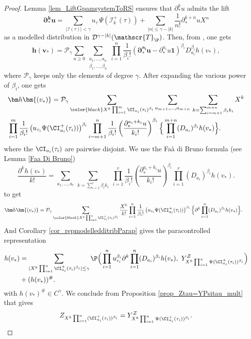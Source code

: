 \documentclass[11pt]{preprint}
\newcommand{\mcI}{\mathcal{I}}
\newcommand{\mcD}{\mathcal{D}}
\newcommand{\mcZ}{\mathcal{Z}}
\def\one{\mathbf{1}}
\newcommand{\scrT}{\mathscr{T}}
\begin{document}
	\begin{proof}
		Lemma \ref{lem_LiftGpamsystemToRS} ensures that $\partial^k_{*}u$ admits the lift
$$	\bm{\partial_{*}^{k} u} = \sum_{|\mcI(\tau)|<\gamma } u_\tau \, \Psi(\mcI_{k}^+ (\tau))  + \sum_{ |n|\leq \gamma - |k|} \frac{1}{n!}\partial_*^{k + n} u X^{n}$$
as a modelled distribution in $\mcD^{\gamma-|k|}(\scrT_\P)$. Then, from  \cite[Theorem 4.16]{Hai14}, one gets
		$$
		{\bm h}\bm{(v_{*} )} = \mathcal{P}_{\gamma} \sum_{n \geq 0 } \sum_{\substack{ a_1,...,a_n \\ \beta_1,...,\beta_n}} \prod_{i=1}^n \frac{1}{\beta_i !} ( 	\bm{\partial_{*}^{a_i} u} -  \partial_{*}^{a_i} u \one)^{\beta_i} D_{a_i}^{\beta_i} h(v_*),
		$$
		where $\mathcal{P}_{\gamma}$ keeps only the elements of degree $\gamma$. After expanding the various power of $\beta_i$, one gets
		\begin{equation*}
			\begin{aligned}
	&	{\bm h}\bm{(v_{*} )} = \mathcal{P}_{\gamma} 
	\sum_{{\color{black} X^k \prod_{i=1}^m\CI_{a_i}(\tau_i)^{\beta_i}}}
	\sum_{a_{m+1},...,a_{m+n}} \, \sum_{k = \sum_{i=m+1}^{m+n} \beta_i k_i} X^k
	\\ & \prod_{i=1}^{m} \frac{1}{\beta_i !} \left( u_{\tau_i} \Psi(\CI_{a_i}^+(\tau_i)) \right)^{\beta_i}     \prod_{i=m+1}^{n} \frac{1}{\beta_i !} \left(  \frac{ \partial_{*}^{a_i +k_i} u}{k_i!} \right)^{\beta_i} \Big\{ \prod_{i=1}^{m+n} (D_{a_{i}})^{\beta_{i}} h(v_*) \Big\}.
		 \end{aligned}
		\end{equation*}
		where the $ \CI_{a_i}(\tau_i) $ are pairwise disjoint.
		 We use the Fa\`a di Bruno formula (see Lemma \ref{Faa Di Bruno}) 
		$$
		\frac{\partial^{k}h(v_*)}{k!} =  \sum_{a_1,...,a_r} \, \sum_{k = \sum_{i=1}^r \beta_i k_i} \; \prod_{i=1}^r \frac{1}{\beta_i !} \left(\frac{\partial_{*}^{a_i +k_i} u}{k_i!}\right)^{\beta_i} \prod_{i=1}^r (D_{a_i})^{\beta_i} h(v_*).
		$$
		to get
		\begin{equation*}
			\begin{aligned}
				&	{\bm h}\bm{(v_{*})} = \mathcal{P}_{\gamma} 
				\sum_{{\color{black}  X^k \prod_{i=1}^n\CI_{a_i}^+(\tau_i)^{\beta_i}}}
				  \frac{X^k}{k!}
				 \prod_{i=1}^{n} \frac{1}{\beta_i !} \left( u_{\tau_i} \Psi(\CI_{a_i}^+(\tau_i)) \right)^{\beta_i}     \Big\{ \partial^k \prod_{i=1}^{n} (D_{a_{i}})^{\beta_{i}} h(v_*) \Big\}.
			\end{aligned}
		\end{equation*}
		And Corollary \ref{cor_repmodelledditribParap} gives the paracontrolled representation
		\begin{align*}
			h(v_*) & = \sum_{|X^k \prod_{i=1}^n\CI_{a_i}^+(\tau_i)^{\beta_i} | \leq \gamma}  \P \Big( \prod_{i=1}^n u_{\tau_i}^{\beta_i} \partial^k \prod_{i=1}^{n} (D_{a_{i}})^{\beta_{i}} h(v_*) , \,\,  Y^\mcZ_{X^k \prod_{i=1}^n\Psi(\CI_{a_i}^+(\tau_i))^{\beta_i} } \Big) \\ & + (h(v_*))^\#.
		\end{align*}
		with $h(v_*)^\#\in C^\gamma$. 
	We conclude from  Proposition \ref{prop_Ztau=YPsitau_mult} that gives
		$$
		Z_{X^k \prod_{i=1}^n (\CI_{a_i}^+(\tau_i))^{\beta_i} }  = Y^\mcZ_{X^k \prod_{i=1}^n\Psi(\CI_{a_i}^+(\tau_i))^{\beta_i} }.
		$$
	\end{proof}
	
\end{document}
